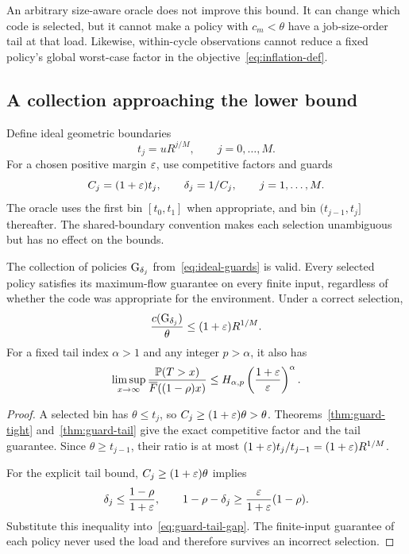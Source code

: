 An arbitrary size-aware oracle does not improve this bound. It can change which code is selected, but it cannot make a policy with $c_m<\theta$ have a job-size-order tail at that load. Likewise, within-cycle observations cannot reduce a fixed policy's global worst-case factor in the objective~\eqref{eq:inflation-def}.

\subsection{A collection approaching the lower bound}
Define ideal geometric boundaries
\begin{equation}\label{eq:ideal-boundaries}
 t_j=uR^{j/M},\qquad j=0,\ldots,M.
\end{equation}
For a chosen positive margin $\varepsilon$, use competitive factors and guards
\begin{equation}\label{eq:ideal-guards}
 C_j=(1+\varepsilon)t_j,
 \qquad \delta_j=1/C_j,
 \qquad j=1,\ldots,M.
\end{equation}
The oracle uses the first bin $[t_0,t_1]$ when appropriate, and bin $(t_{j-1},t_j]$ thereafter. The shared-boundary convention makes each selection unambiguous but has no effect on the bounds.

\begin{proposition}\label{prop:geometric}
The collection of policies $\operatorname{G}_{\delta_j}$ from~\eqref{eq:ideal-guards} is valid. Every selected policy satisfies its maximum-flow guarantee on every finite input, regardless of whether the code was appropriate for the environment. Under a correct selection,
\begin{equation}\label{eq:ideal-inflation}
 \frac{c(\operatorname{G}_{\delta_j})}{\theta}
 \leq(1+\varepsilon)R^{1/M}.
\end{equation}
For a fixed tail index $\alpha>1$ and any integer $p>\alpha$, it also has
\begin{equation}\label{eq:uniform-slack-tail}
 \limsup_{x\to\infty}
 \frac{\mathbb P(T>x)}{\overline F((1-\rho)x)}
 \leq H_{\alpha,p}\left(\frac{1+\varepsilon}{\varepsilon}\right)^\alpha.
\end{equation}
\end{proposition}
\begin{proof}
A selected bin has $\theta\leq t_j$, so $C_j\geq(1+\varepsilon)\theta>\theta$. Theorems~\ref{thm:guard-tight} and~\ref{thm:guard-tail} give the exact competitive factor and the tail guarantee. Since $\theta\geq t_{j-1}$, their ratio is at most $(1+\varepsilon)t_j/t_{j-1}=(1+\varepsilon)R^{1/M}$.

For the explicit tail bound, $C_j\geq(1+\varepsilon)\theta$ implies
\[
 \delta_j\leq\frac{1-\rho}{1+\varepsilon},\qquad
 1-\rho-\delta_j\geq\frac{\varepsilon}{1+\varepsilon}(1-\rho).
\]
Substitute this inequality into~\eqref{eq:guard-tail-gap}. The finite-input guarantee of each policy never used the load and therefore survives an incorrect selection.
\end{proof}

